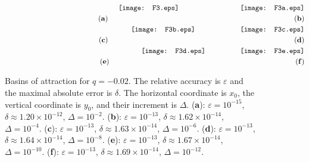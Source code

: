 \documentclass[twocolumn,showpacs,preprintnumbers,amsmath,amssymb,floatfix,nofootinbib]{revtex4-1}
\newcommand{\ba}{\begin{eqnarray}}
\newcommand{\ea}{\end{eqnarray}}
\newcommand{\non}{\nonumber}
\begin{document}
\begin{figure*}[p]
\begin{center}
\ba
&&\hspace{1.1cm}\texttt{[image: F3.eps]}
\hspace{3.0cm}\texttt{[image: F3a.eps]}\non\\
&&\hspace{4.2cm}({\bf a})\hspace{9.1cm}({\bf b})\non\\
&&\hspace{0.52cm}\texttt{[image: F3b.eps]}
\hspace{2.2cm}\texttt{[image: F3c.eps]}\non\\
&&\hspace{4.2cm}({\bf c})\hspace{9.1cm}({\bf d})\non\\
&&\hspace{0.2cm}\texttt{[image: F3d.eps]}
\hspace{1.7cm}\texttt{[image: F3e.eps]}\non\\
&&\hspace{4.2cm}({\bf e})\hspace{9.1cm}({\bf f})\non
\ea
\caption{Basins of attraction for $q=-0.02$. The relative accuracy is $\varepsilon$ and the maximal absolute error is $\delta$. The horizontal coordinate is $x_0$, the vertical coordinate is $y_0$, and their increment is $\Delta$.   ({\bf a}): $\varepsilon=10^{-15}$, $\delta\approx1.20\times10^{-12}$, $\Delta=10^{-2}$. ({\bf b}): $\varepsilon=10^{-13}$, $\delta\approx1.62\times10^{-14}$, $\Delta=10^{-4}$. ({\bf c}): $\varepsilon=10^{-13}$, $\delta\approx1.63\times10^{-14}$, $\Delta=10^{-6}$. ({\bf d}): $\varepsilon=10^{-13}$, $\delta\approx1.64\times10^{-14}$, $\Delta=10^{-8}$. ({\bf e}): $\varepsilon=10^{-13}$, $\delta\approx1.67\times10^{-14}$, $\Delta=10^{-10}$. ({\bf f}): $\varepsilon=10^{-13}$, $\delta\approx1.69\times10^{-14}$, $\Delta=10^{-12}$.}\label{fig8}
\end{center}
\end{figure*}
\end{document}
